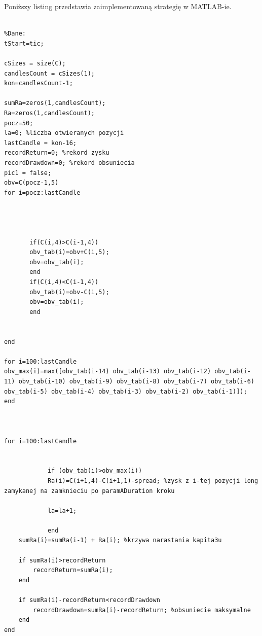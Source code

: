\documentclass[12pt,a4paper]{article}
\begin{document}
\noindent Poniższy listing przedstawia zaimplementowaną strategię w MATLAB-ie.
\begin{scriptsize}
\begin{lstlisting}

%Dane:
tStart=tic;

cSizes = size(C);
candlesCount = cSizes(1);
kon=candlesCount-1;

sumRa=zeros(1,candlesCount);
Ra=zeros(1,candlesCount);
pocz=50;
la=0; %liczba otwieranych pozycji
lastCandle = kon-16;
recordReturn=0; %rekord zysku
recordDrawdown=0; %rekord obsuniecia
pic1 = false;
obv=C(pocz-1,5)
for i=pocz:lastCandle
    
   
    
    
       if(C(i,4)>C(i-1,4))
       obv_tab(i)=obv+C(i,5);
       obv=obv_tab(i);
       end
       if(C(i,4)<C(i-1,4))
       obv_tab(i)=obv-C(i,5);
       obv=obv_tab(i);
       end
       
        
end

for i=100:lastCandle
obv_max(i)=max([obv_tab(i-14) obv_tab(i-13) obv_tab(i-12) obv_tab(i-11) obv_tab(i-10) obv_tab(i-9) obv_tab(i-8) obv_tab(i-7) obv_tab(i-6) obv_tab(i-5) obv_tab(i-4) obv_tab(i-3) obv_tab(i-2) obv_tab(i-1)]);
end



for i=100:lastCandle
    
    
            if (obv_tab(i)>obv_max(i))
            Ra(i)=C(i+1,4)-C(i+1,1)-spread; %zysk z i-tej pozycji long zamykanej na zamknieciu po paramADuration kroku
            
            la=la+1;
      
            end
    sumRa(i)=sumRa(i-1) + Ra(i); %krzywa narastania kapita3u
    
    if sumRa(i)>recordReturn
        recordReturn=sumRa(i);
    end
    
    if sumRa(i)-recordReturn<recordDrawdown
        recordDrawdown=sumRa(i)-recordReturn; %obsuniecie maksymalne
    end
end


\end{lstlisting}
\end{scriptsize}
\end{document}
